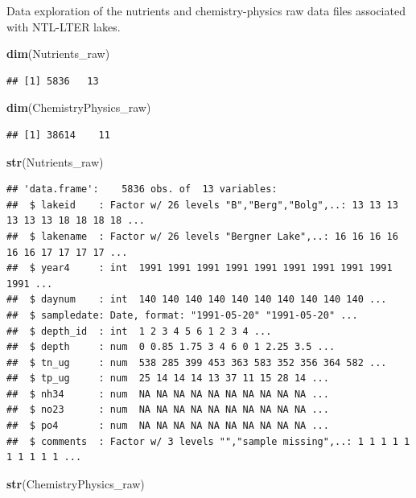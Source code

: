 \documentclass[12pt,]{article}
\newenvironment{Shaded}{\begin{snugshade}}{\end{snugshade}}
\newcommand{\KeywordTok}[1]{\textcolor[rgb]{0.13,0.29,0.53}{\textbf{#1}}}
\newcommand{\NormalTok}[1]{#1}
\begin{document}
Data exploration of the nutrients and chemistry-physics raw data files
associated with NTL-LTER lakes.

\begin{Shaded}
\begin{Highlighting}[]
\KeywordTok{dim}\NormalTok{(Nutrients_raw)}
\end{Highlighting}
\end{Shaded}

\begin{verbatim}
## [1] 5836   13
\end{verbatim}

\begin{Shaded}
\begin{Highlighting}[]
\KeywordTok{dim}\NormalTok{(ChemistryPhysics_raw)}
\end{Highlighting}
\end{Shaded}

\begin{verbatim}
## [1] 38614    11
\end{verbatim}

\begin{Shaded}
\begin{Highlighting}[]
\KeywordTok{str}\NormalTok{(Nutrients_raw)}
\end{Highlighting}
\end{Shaded}

\begin{verbatim}
## 'data.frame':    5836 obs. of  13 variables:
##  $ lakeid    : Factor w/ 26 levels "B","Berg","Bolg",..: 13 13 13 13 13 13 18 18 18 18 ...
##  $ lakename  : Factor w/ 26 levels "Bergner Lake",..: 16 16 16 16 16 16 17 17 17 17 ...
##  $ year4     : int  1991 1991 1991 1991 1991 1991 1991 1991 1991 1991 ...
##  $ daynum    : int  140 140 140 140 140 140 140 140 140 140 ...
##  $ sampledate: Date, format: "1991-05-20" "1991-05-20" ...
##  $ depth_id  : int  1 2 3 4 5 6 1 2 3 4 ...
##  $ depth     : num  0 0.85 1.75 3 4 6 0 1 2.25 3.5 ...
##  $ tn_ug     : num  538 285 399 453 363 583 352 356 364 582 ...
##  $ tp_ug     : num  25 14 14 14 13 37 11 15 28 14 ...
##  $ nh34      : num  NA NA NA NA NA NA NA NA NA NA ...
##  $ no23      : num  NA NA NA NA NA NA NA NA NA NA ...
##  $ po4       : num  NA NA NA NA NA NA NA NA NA NA ...
##  $ comments  : Factor w/ 3 levels "","sample missing",..: 1 1 1 1 1 1 1 1 1 1 ...
\end{verbatim}

\begin{Shaded}
\begin{Highlighting}[]
\KeywordTok{str}\NormalTok{(ChemistryPhysics_raw)}
\end{Highlighting}
\end{Shaded}
\end{document}
